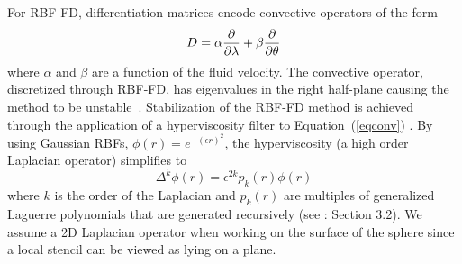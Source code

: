 \documentclass[11pt]{report}
\begin{document}
{For RBF-FD, differentiation matrices encode convective operators of the form 
\begin{equation}
D = \alpha \frac{\partial }{\partial \lambda} + \beta \frac{\partial }{\partial \theta} \label{eqconv}
\end{equation}
where $\alpha$ and $\beta$ are a function of the fluid velocity. The convective operator, discretized
through RBF-FD, has eigenvalues 
 in the right half-plane causing the method to be unstable~\cite{FornbergLehto11, FlyerLehto11}. 
Stabilization of the RBF-FD method is achieved through the application of a hyperviscosity filter 
to Equation~(\ref{eqconv}) \cite{FornbergLehto11}. By using Gaussian 
 RBFs, $\phi(r) = e^{-(\epsilon r)^2}$, the hyperviscosity (a high order Laplacian operator) simplifies to
\begin{equation}
\Delta^{k}\phi(r) = \epsilon^{2k} p_k(r) \phi(r)
\label{eqn:gaussian_hv}
\end{equation}
where $k$ is the order of the Laplacian and  $p_k(r)$ are multiples of generalized Laguerre polynomials that
are generated recursively (see \cite{FornbergLehto11}: Section 3.2). We assume a 2D  Laplacian operator 
when working on the surface of the sphere since a local stencil can be viewed as lying on a plane.


}
\end{document}
